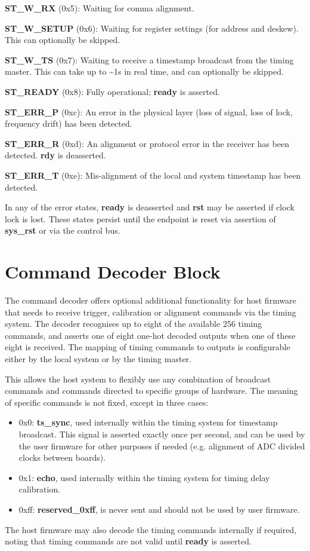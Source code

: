 \documentclass{article}
\begin{document}
\textbf{ST\_W\_RX} (0x5): Waiting for comma alignment.

\textbf{ST\_W\_SETUP} (0x6): Waiting for register settings (for address and deskew). This can optionally be skipped.

\textbf{ST\_W\_TS} (0x7): Waiting to receive a timestamp broadcast from the timing master. This can take up to \textasciitilde{}1s in real time, and can optionally be skipped.

\textbf{ST\_READY} (0x8): Fully operational; \textbf{ready} is asserted.

\textbf{ST\_ERR\_P} (0xc): An error in the physical layer (loss of signal, loss of lock, frequency drift) has been detected.

\textbf{ST\_ERR\_R} (0xd): An alignment or protocol error in the receiver has been detected. \textbf{rdy} is deasserted.

\textbf{ST\_ERR\_T} (0xe): Mis-alignment of the local and system timestamp has been detected.

In any of the error states, \textbf{ready} is deasserted and \textbf{rst} may be asserted if clock lock is lost. These states persist until the endpoint is reset via assertion of \textbf{sys\_rst} or via the control bus.

\section{Command Decoder Block}

The command decoder offers optional additional functionality for host firmware that needs to receive trigger, calibration or alignment commands via the timing system. The decoder recognises up to eight of the available 256 timing commands, and asserts one of eight one-hot decoded outputs when one of these eight is received. The mapping of timing commands to outputs is configurable either by the local system or by the timing master.

This allows the host system to flexibly use any combination of broadcast commands and commands directed to specific groups of hardware. The meaning of specific commands is not fixed, except in three cases:
\begin{itemize}
\item 0x0: \textbf{ts\_sync}, used internally within the timing system for timestamp broadcast. This signal is asserted exactly once per second, and can be used by the user firmware for other purposes if needed (e.g. alignment of ADC divided clocks between boards).
\item 0x1: \textbf{echo}, used internally within the timing system for timing delay calibration.
\item 0xff: \textbf{reserved\_0xff}, is never sent and should not be used by user firmware.
\end{itemize}
The host firmware may also decode the timing commands internally if required, noting that timing commands are not valid until \textbf{ready} is asserted.
\end{document}
